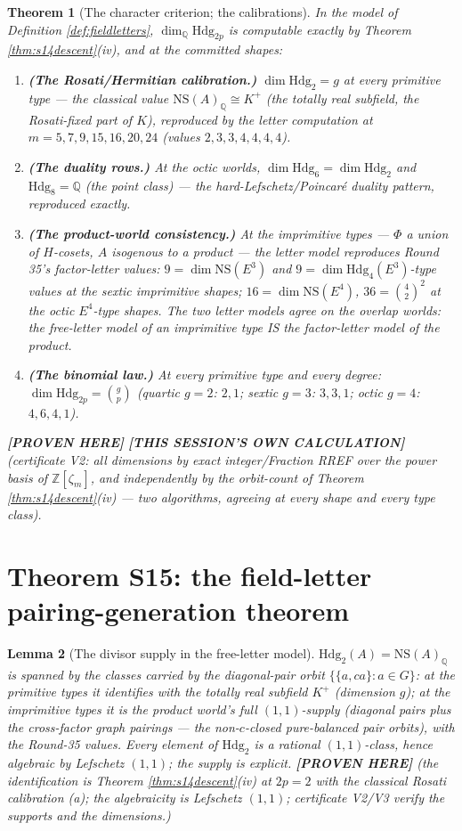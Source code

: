 \documentclass[11pt]{article}
\newtheorem{theorem}{Theorem}
\newtheorem{lemma}[theorem]{Lemma}
\newcommand{\PROVEN}{\textbf{[PROVEN HERE]}}
\newcommand{\MINE}{\textbf{[THIS SESSION'S OWN CALCULATION]}}
\newcommand{\Z}{\mathbb{Z}}
\newcommand{\Q}{\mathbb{Q}}
\newcommand{\NS}{\mathrm{NS}}
\newcommand{\Hdg}{\mathrm{Hdg}}
\begin{document}
\begin{theorem}[The character criterion; the calibrations]\label{thm:s14}
In the model of Definition \ref{def:fieldletters}, $\dim_\Q\Hdg_{2p}$ is
computable exactly by Theorem \ref{thm:s14descent}(iv), and at the committed
shapes:
\begin{enumerate}[label=(\alph*)]
\item \textbf{(The Rosati/Hermitian calibration.)} $\dim\Hdg_2=g$ at every
primitive type --- the classical value $\NS(A)_\Q\cong K^{+}$ (the totally real
subfield, the Rosati-fixed part of $K$), reproduced by the letter computation at
$m=5,7,9,15,16,20,24$ (values $2,3,3,4,4,4,4$).
\item \textbf{(The duality rows.)} At the octic worlds,
$\dim\Hdg_6=\dim\Hdg_2$ and $\Hdg_8=\Q$ (the point class) --- the
hard-Lefschetz/Poincar\'e duality pattern, reproduced exactly.
\item \textbf{(The product-world consistency.)} At the imprimitive types ---
$\Phi$ a union of $H$-cosets, $A$ isogenous to a product --- the letter model
reproduces Round 35's factor-letter values: $9=\dim\NS(E^3)$ and
$9=\dim\Hdg_4(E^3)$-type values at the sextic imprimitive shapes;
$16=\dim\NS(E^4)$, $36=\binom{4}{2}^2$ at the octic $E^4$-type shapes. The two
letter models agree on the overlap worlds: the free-letter model of an
imprimitive type IS the factor-letter model of the product.
\item \textbf{(The binomial law.)} At every primitive type and every degree:
$\dim\Hdg_{2p}=\binom{g}{p}$ (quartic $g{=}2$: $2,1$; sextic $g{=}3$: $3,3,1$;
octic $g{=}4$: $4,6,4,1$).
\end{enumerate}
\PROVEN{} \MINE{} (certificate V2: all dimensions by exact integer/Fraction RREF
over the power basis of $\Z[\zeta_m]$, and independently by the orbit-count of
Theorem \ref{thm:s14descent}(iv) --- two algorithms, agreeing at every shape and
every type class).
\end{theorem}

\section{Theorem S15: the field-letter pairing-generation theorem}

\begin{lemma}[The divisor supply in the free-letter model]\label{lem:fielddivisors}
$\Hdg_2(A)=\NS(A)_\Q$ is spanned by the classes carried by the diagonal-pair
orbit $\{\{a,ca\}:a\in G\}$: at the primitive types it identifies with the
totally real subfield $K^+$ (dimension $g$); at the imprimitive types it is the
product world's full $(1,1)$-supply (diagonal pairs plus the cross-factor graph
pairings --- the non-$c$-closed pure-balanced pair orbits), with the Round-35
values. Every element of $\Hdg_2$ is a rational $(1,1)$-class, hence algebraic
by Lefschetz $(1,1)$; the supply is explicit.
\PROVEN{} (the identification is Theorem \ref{thm:s14descent}(iv) at $2p=2$ with
the classical Rosati calibration (a); the algebraicity is Lefschetz
$(1,1)$; certificate V2/V3 verify the supports and the dimensions.)
\end{lemma}
\end{document}
